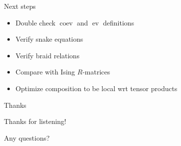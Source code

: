 \documentclass{beamer}
\DeclareMathOperator{\ev}{ev}
\DeclareMathOperator{\coev}{coev}
\newcommand{\img}[1]{
\vfill
\centering
\texttt{[image: \#1]}
\vfill
}
\begin{document}



\begin{frame}{Next steps}
\begin{itemize}
\item Double check $\coev$ and $\ev$ definitions
\item Verify snake equations
\item Verify braid relations
\item Compare with Ising $R$-matrices
\item Optimize composition to be local wrt tensor products
\end{itemize}
\end{frame}

\begin{frame}{Thanks}

Thanks for listening!

Any questions?
\end{frame}
\end{document}
